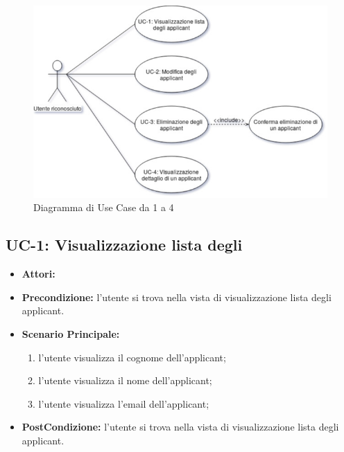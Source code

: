\vspace{0.5em}
\begin{figure}[!h] 
	\centering 
	\includegraphics[width=1\columnwidth]{immagini/usecase/UC1} 
	\caption{Diagramma di Use Case da 1 a 4}
	\label{figura:uc-1}
\end{figure}


\subsection{UC-1: Visualizzazione lista degli\applicant}
\begin{itemize}
	\item \textbf{Attori:}\loggedusr
	\item \textbf{Precondizione:} l'utente si trova nella vista di visualizzazione lista degli applicant.
	\item \textbf{Scenario Principale:} 
		\begin{enumerate}
			\item l'utente visualizza il cognome dell'applicant; 
			\item l'utente visualizza il nome dell'applicant;
			\item l'utente visualizza l'email dell'applicant;
		\end{enumerate}
	\item \textbf{PostCondizione:} l'utente si trova nella vista di visualizzazione lista degli applicant.
\end{itemize}

